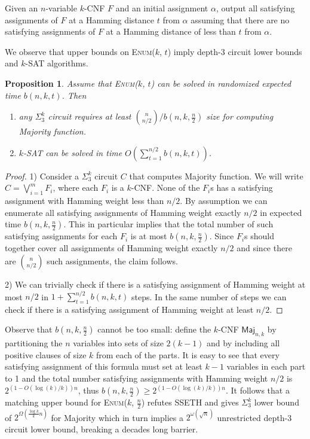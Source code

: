 \documentclass[10pt,a4paper]{article}
\newtheorem{proposition}{Proposition}
\newcommand{\Maj}{\mathsf{Maj}}
\newcommand\enumballsat[2]{\textsc{Enum($#1$, $#2$)}}
\begin{document}
\bigskip
\noindent{\bf{\enumballsat{k}{t}}.} Given an $n$-variable $k$-CNF $F$ 
and an initial assignment $\alpha$, 
output all satisfying assignments of $F$ at a Hamming distance $t$
from $\alpha$ assuming that there are no satisfying assignments
of $F$ at a Hamming distance of less than $t$ from $\alpha$.

\bigskip
We observe that upper bounds on \enumballsat{k}{t} imply depth-3 circuit lower bounds and $k$-SAT algorithms.

\begin{proposition}
Assume that \enumballsat{k}{t} can be solved in randomized expected time $b(n, k, t)$. Then 
\begin{enumerate}
	\item any $\Sigma^k_3$ circuit requires at least $\binom{n}{n/2}/b(n, k, \frac{n}{2})$ size for computing Majority function.
	\item $k$-SAT can be solved in time $O(\sum_{t = 1}^{n/2}b(n, k, t))$.
\end{enumerate}
\end{proposition}


\begin{proof}
1) Consider a $\Sigma^k_3$ circuit $C$ that computes Majority function.
We will write $C= \bigvee_{i = 1}^m F_i$, where each $F_i$ is a $k$-CNF. 
None of the $F_i$s has a satisfying assignment with Hamming 
weight less than $n/2$. 
By assumption we can enumerate all satisfying assignments of Hamming weight exactly $n/2$ in expected time $b(n, k, \frac{n}{2})$. 
This in particular implies that the total number of such 
satisfying assignments for each $F_i$ is at most $b(n, k, \frac{n}{2})$. 
Since $F_i$s should together cover all 
assignments of Hamming weight exactly 
$n/2$ and since there are $\binom{n}{n/2}$ such assignments, 
the claim follows.

2) We can trivially check if there is a satisfying assignment of Hamming weight at most $n/2$  in $1 + \sum_{t = 1}^{n/2}b(n, k, t)$ steps. In the same number of steps we can check if there is a satisfying assignment of Hamming weight at least $n/2$.
\end{proof}

Observe that $b(n, k, \frac{n}{2})$ cannot be too small: 
define the $k$-CNF $\Maj_{n, k}$ by partitioning the $n$ variables into 
sets of size $2(k - 1)$ and 
by including all positive clauses of size $k$
from each of the parts. It is easy to see that every satisfying assignment 
of this formula must set at least $k - 1$ variables in each 
part to 1 and the total number satisfying assignments with 
Hamming weight $n/2$ is $2^{(1 - O(\log(k)/k))n}$, 
thus $b(n, k, \frac{n}{2}) \ge 2^{(1 - O(\log(k)/k))n}$. It 
follows that a matching upper bound 
for \enumballsat{k}{\frac{n}{2}} refutes SSETH and 
gives $\Sigma^k_3$ lower bound of $2^{\Omega(\frac{\log k}{k}n)}$ 
for Majority which in turn implies a $2^{\omega(\sqrt{n})}$ unrestricted depth-3 circuit lower bound, breaking a decades long barrier.
\end{document}
